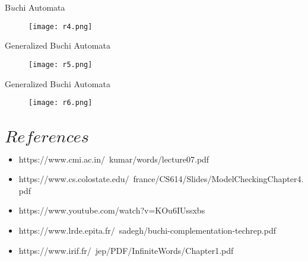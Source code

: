 \documentclass[17pt, t, lualatex]{beamer}
\begin{document}
\begin{frame}{B$\ddot{u}$chi Automata}
    \begin{figure}
        \centering
        \texttt{[image: r4.png]}
    \end{figure}
\end{frame}

\begin{frame}{Generalized B$\ddot{u}$chi Automata}
    \begin{figure}
        \centering
        \texttt{[image: r5.png]}
    \end{figure}
\end{frame}

\begin{frame}{Generalized B$\ddot{u}$chi Automata}
    \begin{figure}
        \centering
        \texttt{[image: r6.png]}
    \end{figure}
\end{frame}

\section{$References$}

\insertsectionpage

\begin{frame}{}
    
\begin{itemize}
    \item https://www.cmi.ac.in/~kumar/words/lecture07.pdf
    \item https://www.cs.colostate.edu/~france/CS614/Slides/ModelCheckingChapter4.pdf
    \item https://www.youtube.com/watch?v=KOu6IUssxbs
    \item https://www.lrde.epita.fr/~sadegh/buchi-complementation-techrep.pdf
    \item https://www.irif.fr/~jep/PDF/InfiniteWords/Chapter1.pdf
\end{itemize}

\end{frame}

\insertendpage
\end{document}
